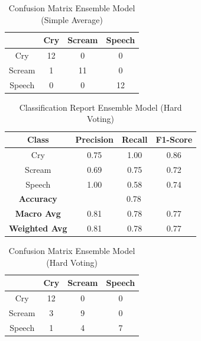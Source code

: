 \documentclass[conference]{IEEEtran}
\begin{document}
\begin{table}[htbp]
\caption{Confusion Matrix Ensemble Model (Simple Average)}
\begin{center}
\begin{tabular}{|c|c|c|c|}
\hline
& \textbf{Cry} & \textbf{Scream} & \textbf{Speech} \\
\hline
Cry & 12 & 0 & 0 \\
\hline
Scream & 1 & 11 & 0 \\
\hline
Speech & 0 & 0 & 12 \\
\hline
\end{tabular}
\label{tab:confusion_matrix_ensemble}
\end{center}
\end{table}

\begin{table}[htbp]
\caption{Classification Report Ensemble Model (Hard Voting)}
\begin{center}
\begin{tabular}{|c|c|c|c|}
\hline
\textbf{Class} & \textbf{Precision} & \textbf{Recall} & \textbf{F1-Score} \\
\hline
Cry & 0.75 & 1.00 & 0.86 \\
\hline
Scream & 0.69 & 0.75 & 0.72 \\
\hline
Speech & 1.00 & 0.58 & 0.74 \\
\hline
\textbf{Accuracy} & \multicolumn{3}{|c|}{0.78} \\
\hline
\textbf{Macro Avg} & 0.81 & 0.78 & 0.77 \\
\hline
\textbf{Weighted Avg} & 0.81 & 0.78 & 0.77 \\
\hline
\end{tabular}
\label{tab:classification_report_hard_voting}
\end{center}
\end{table}

\begin{table}[htbp]
\caption{Confusion Matrix Ensemble Model (Hard Voting)}
\begin{center}
\begin{tabular}{|c|c|c|c|}
\hline
& \textbf{Cry} & \textbf{Scream} & \textbf{Speech} \\
\hline
Cry & 12 & 0 & 0 \\
\hline
Scream & 3 & 9 & 0 \\
\hline
Speech & 1 & 4 & 7 \\
\hline
\end{tabular}
\label{tab:confusion_matrix_hard_voting}
\end{center}
\end{table}
\end{document}
